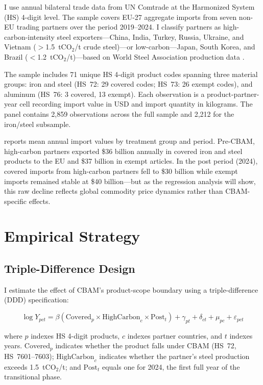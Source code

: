 \documentclass[12pt]{article}
\begin{document}
I use annual bilateral trade data from UN Comtrade at the Harmonized System (HS) 4-digit level. The sample covers EU-27 aggregate imports from seven non-EU trading partners over the period 2019--2024. I classify partners as high-carbon-intensity steel exporters---China, India, Turkey, Russia, Ukraine, and Vietnam ($>$1.5~tCO$_2$/t crude steel)---or low-carbon---Japan, South Korea, and Brazil ($<$1.2~tCO$_2$/t)---based on World Steel Association production data \citep{worldsteel_2023}.

The sample includes 71 unique HS 4-digit product codes spanning three material groups: iron and steel (HS~72: 29 covered codes; HS~73: 26 exempt codes), and aluminum (HS~76: 3 covered, 13 exempt). Each observation is a product-partner-year cell recording import value in USD and import quantity in kilograms. The panel contains 2,859 observations across the full sample and 2,212 for the iron/steel subsample.

 reports mean annual import values by treatment group and period. Pre-CBAM, high-carbon partners exported \$36 billion annually in covered iron and steel products to the EU and \$37 billion in exempt articles. In the post period (2024), covered imports from high-carbon partners fell to \$30 billion while exempt imports remained stable at \$40 billion---but as the regression analysis will show, this raw decline reflects global commodity price dynamics rather than CBAM-specific effects.




\section{Empirical Strategy}
\label{sec:strategy}

\subsection{Triple-Difference Design}

I estimate the effect of CBAM's product-scope boundary using a triple-difference (DDD) specification:

\begin{equation}
\label{eq:ddd}
\log Y_{pct} = \beta \left( \text{Covered}_p \times \text{HighCarbon}_c \times \text{Post}_t \right) + \gamma_{pt} + \delta_{ct} + \mu_{pc} + \varepsilon_{pct}
\end{equation}

\noindent where $p$ indexes HS 4-digit products, $c$ indexes partner countries, and $t$ indexes years. $\text{Covered}_p$ indicates whether the product falls under CBAM (HS~72, HS~7601--7603); $\text{HighCarbon}_c$ indicates whether the partner's steel production exceeds 1.5~tCO$_2$/t; and $\text{Post}_t$ equals one for 2024, the first full year of the transitional phase.
\end{document}
